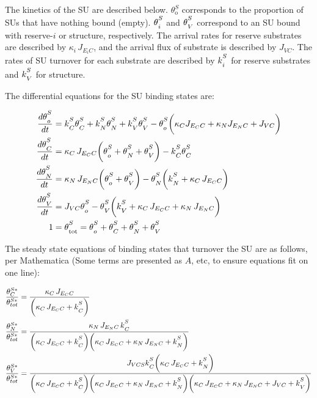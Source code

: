 \documentclass[
]{article}
\begin{document}
The kinetics of the SU are described below. \(\theta_{\text{o}}^S\)
corresponds to the proportion of SUs that have nothing bound (empty).
\({\theta\strut^{S}_{i}}\) and \({\theta\strut^{S}_{{V}}}\) correspond
to an SU bound with reserve-\(i\) or structure, respectively. The
arrival rates for reserve substrates are described by
\({\kappa_i}\,{J_{{E_i}C}}\), and the arrival flux of substrate is
described by \(J_{{VC}}\). The rates of SU turnover for each substrate
are described by \({k\strut^S_i}\) for reserve substrates and
\({k\strut^S_V}\) for structure.

The differential equations for the SU binding states are:

\begin{align}
\frac{d{\theta\strut^{S}_{o}}}{dt} &= {k\strut^S_C}{\theta\strut^{S}_{{C}}} + {k\strut^S_N}{\theta\strut^{S}_{{N}}} + {k\strut^S_V}{\theta\strut^{S}_{{V}}} - {\theta\strut^{S}_{o}}\biggl({\kappa_C}{J_{{E_C}C}} + {\kappa_N}{J_{{E_N}C}} + J_{{VC}}\biggr)
\\
\frac{d{\theta\strut^{S}_C}}{dt} &= {\kappa_C}\,{J_{{E_C}C}}\biggl({\theta\strut^{S}_{o}} + {\theta\strut^{S}_{N}}  + {\theta\strut^{S}_{V}}\biggr) - {k\strut^S_C}{\theta\strut^{S}_{{C}}}
\\
\frac{d{\theta\strut^{S}_N}}{dt} &= {\kappa_N}\,{J_{{E_N}C}}\biggl({\theta\strut^{S}_{o}} + {\theta\strut^{S}_{V}}\biggr) - {\theta\strut^{S}_{{N}}}\biggl({k\strut^S_N} + {\kappa_C}\,{J_{{E_C}C}}\biggr)
\\
\frac{d{\theta\strut^{S}_V}}{dt} &= J_{{VC}}{\theta\strut^{S}_{o}} - {\theta\strut^{S}_{{V}}}\biggl({k\strut^S_V} +  {\kappa_C}\,{J_{{E_C}C}} + {\kappa_N}\,{J_{{E_N}C}}\biggr)
\\
1 &= {\theta\strut^{S}_{\text{tot}}} = {\theta\strut^{S}_{o}} + {\theta\strut^{S}_{{C}}} + {\theta\strut^{S}_{N}} + {\theta\strut^{S}_{V}}
\end{align}

The steady state equations of binding states that turnover the SU are as
follows, per Mathematica (Some terms are presented as \(A\), etc, to
ensure equations fit on one line):

\begin{align}
\frac{\theta^{S*}_C}{\theta^{S*}_{tot}} &= \frac{{\kappa_C}\,{J_{{E_C}C}}}{\biggl({\kappa_C}\,{J_{{E_C}C}} + {k\strut^S_C}\biggr)}
\\
\frac{\theta^{S*}_N}{\theta^{S*}_{tot}}&= \frac{{\kappa_N}\,{J_{{E_N}C}}\,{k\strut^S_C}}{\biggl({\kappa_C}\,{J_{{E_C}C}} + {k\strut^S_C}\biggr)\biggl({\kappa_C}\,{J_{{E_C}C}} + {\kappa_N}\,{J_{{E_N}C}} + {k\strut^S_N}\biggr)}
\\
\frac{\theta^{S*}_V}{\theta^{S*}_{tot}}&= \frac{J_{{VCS}}{k\strut^S_C}\biggl({\kappa_C}\,{J_{{E_C}C}} + {k\strut^S_N}\biggr)}{\biggl({\kappa_C}\,{J_{{E_C}C}} + {k\strut^S_C}\biggr)\biggl({\kappa_C}\,{J_{{E_C}C}} + {\kappa_N}\,{J_{{E_N}C}} + {k\strut^S_N}\biggr)\biggl({\kappa_C}\,{J_{{E_C}C}} + {\kappa_N}\,{J_{{E_N}C}} + J_{VC} + {k\strut^S_V}\biggr)}
\end{align}
\end{document}
